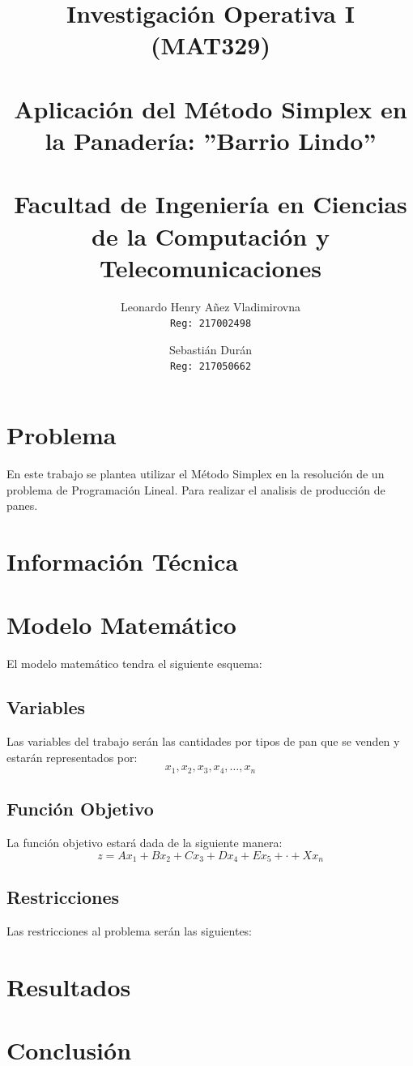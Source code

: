 \documentclass[10pt,letterpaper]{book}
\author{
Leonardo Henry Añez Vladimirovna\\
\texttt{Reg: 217002498}
\and
Sebastián Durán\\
\texttt{Reg: 217050662}
}
\title{
Investigación Operativa I (MAT329)\\ ${ }$\\
\textbf{Aplicación del Método Simplex en la Panadería: ''Barrio Lindo''}
\\ ${ }$\\
\small Facultad de Ingeniería en Ciencias de la Computación y Telecomunicaciones\\}
\begin{document}
\maketitle
\section*{Problema}
En este trabajo se plantea utilizar el Método Simplex en la resolución de un problema de Programación Lineal. Para realizar el analisis de producción de panes.
\section*{Información Técnica}
\section*{Modelo Matemático}
El modelo matemático tendra el siguiente esquema:
\subsection*{Variables}
Las variables del trabajo serán las cantidades por tipos de pan que se venden y estarán representados por:
$$
x_1,x_2,x_3,x_4,\ldots,x_n
$$
\subsection*{Función Objetivo}
La función objetivo estará dada de la  siguiente manera:
$$
z = Ax_1 + Bx_2 + Cx_3 + Dx_4 + Ex_5 + \cdot + Xx_n
$$
\subsection*{Restricciones}
Las restricciones al problema serán las siguientes:
\section*{Resultados}
\section*{Conclusión}
\end{document}
